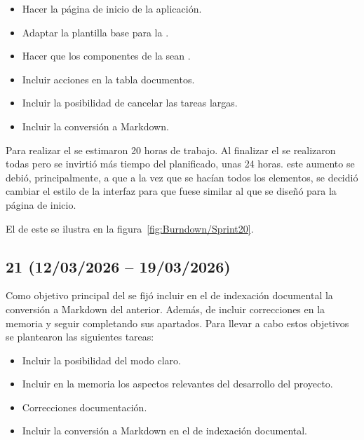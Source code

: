 \begin{itemize}
\tightlist
	\item Hacer la página de inicio de la aplicación.
	\item Adaptar la plantilla base para la .
	\item Hacer que los componentes de la  sean .
	\item Incluir acciones en la tabla documentos.
	\item Incluir la posibilidad de cancelar las tareas largas.
	\item Incluir la conversión a Markdown.
\end{itemize}

Para realizar el  se estimaron 20 horas de trabajo. Al finalizar el  se realizaron todas pero se invirtió más tiempo del planificado, unas 24 horas. este aumento se debió, principalmente, a que a la vez que se hacían  todos los elementos, se decidió cambiar el estilo de la interfaz  para que fuese similar al que se diseñó para la página de inicio.  

El  de este  se ilustra en la figura~\ref{fig:Burndown/Sprint20}.

\subsection{ 21 (12/03/2026 -- 19/03/2026)}
Como objetivo principal del  se fijó incluir en el  de indexación documental la conversión a Markdown del  anterior. Además, de incluir correcciones en la memoria y seguir completando sus apartados. Para llevar a cabo estos objetivos se plantearon las siguientes tareas:
 
\begin{itemize}
\tightlist
	\item Incluir la posibilidad del modo claro.
	\item Incluir en la memoria los aspectos relevantes del desarrollo del proyecto.
	\item Correcciones documentación.
	\item Incluir la conversión a Markdown en el  de indexación documental.
\end{itemize}

